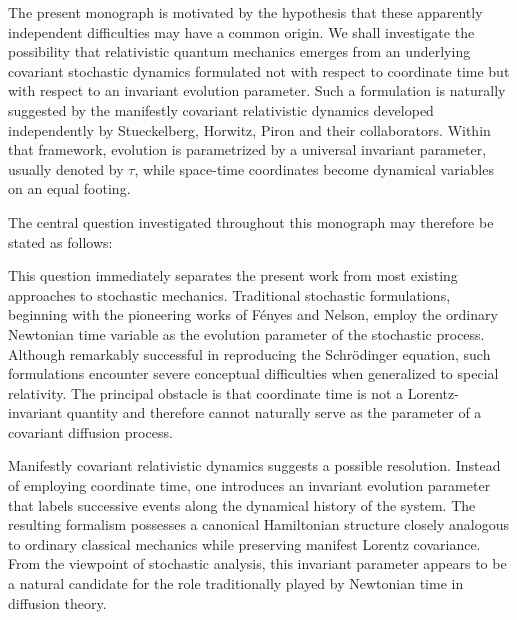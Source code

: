 The present monograph is motivated by the hypothesis that these apparently
independent difficulties may have a common origin. We shall investigate the
possibility that relativistic quantum mechanics emerges from an underlying
covariant stochastic dynamics formulated not with respect to coordinate time
but with respect to an invariant evolution parameter. Such a formulation is
naturally suggested by the manifestly covariant relativistic dynamics
developed independently by Stueckelberg, Horwitz, Piron and their
collaborators. Within that framework, evolution is parametrized by a universal
invariant parameter, usually denoted by $\tau$, while space-time coordinates
become dynamical variables on an equal footing.

The central question investigated throughout this monograph may therefore be
stated as follows:

\begin{center}
\end{center}

This question immediately separates the present work from most existing
approaches to stochastic mechanics. Traditional stochastic formulations,
beginning with the pioneering works of Fényes and Nelson, employ the ordinary
Newtonian time variable as the evolution parameter of the stochastic process.
Although remarkably successful in reproducing the Schrödinger equation, such
formulations encounter severe conceptual difficulties when generalized to
special relativity. The principal obstacle is that coordinate time is not a
Lorentz-invariant quantity and therefore cannot naturally serve as the
parameter of a covariant diffusion process.

Manifestly covariant relativistic dynamics suggests a possible resolution.
Instead of employing coordinate time, one introduces an invariant evolution
parameter that labels successive events along the dynamical history of the
system. The resulting formalism possesses a canonical Hamiltonian structure
closely analogous to ordinary classical mechanics while preserving manifest
Lorentz covariance. From the viewpoint of stochastic analysis, this invariant
parameter appears to be a natural candidate for the role traditionally played
by Newtonian time in diffusion theory.

